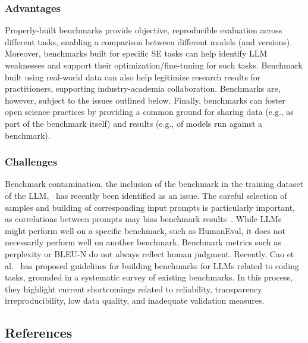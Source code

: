 \subsubsection{Advantages}

Properly-built benchmarks provide objective, reproducible evaluation across different tasks, enabling a comparison between different models (and versions).
Moreover, benchmarks built for specific SE tasks can help identify LLM weaknesses and support their optimization/fine-tuning for such tasks.
Benchmark built using real-world data can also help legitimize research results for practitioners, supporting industry-academia collaboration.
Benchmarks are, however, subject to the issues outlined below.
Finally, benchmarks can foster open science practices by providing a common ground for sharing data (e.g., as part of the benchmark itself) and results (e.g., of models run against a benchmark).

\subsubsection{Challenges}

Benchmark contamination, the inclusion of the benchmark in the training dataset of the LLM,~\cite{DBLP:journals/corr/abs-2410-16186} has recently been identified as an issue.
The careful selection of samples and building of corresponding input prompts is particularly important, as correlations between prompts may bias benchmark results~\cite{DBLP:conf/acl/SiskaMAB24}.
While LLMs might perform well on a specific benchmark, such as HumanEval, it does not necessarily perform well on another benchmark.
Benchmark metrics such as perplexity or BLEU-N do not always reflect human judgment.
Recently, Cao et al.~\cite{cao2025should} has proposed guidelines for building benchmarks for LLMs related to coding tasks, grounded in a systematic survey of existing benchmarks. 
In this process, they highlight current shortcomings related to reliability, transparency irreproducibility, low data quality, and inadequate validation measures.

\subsection{References}






